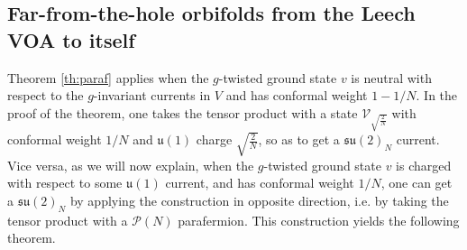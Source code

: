\documentclass[11pt,reqno]{article}
\newcommand{\CV}{\mathcal{V}}
\newcommand{\paraf}{\mathcal{P}}
\newcommand{\alg}[1]{\mathfrak{#1}}
\begin{document}
\subsection{Far-from-the-hole orbifolds from the Leech VOA to itself}

Theorem \ref{th:paraf} applies when the $g$-twisted ground state $v$ is neutral with respect to the $g$-invariant currents in $V$ and has conformal weight $1-1/N$. In the proof of the theorem, one takes the tensor product with a state $\CV_{\sqrt{\frac{2}{N}}}$ with conformal weight $1/N$ and $\alg{u}(1)$ charge $\sqrt{\frac{2}{N}}$, so as to get a $\alg{su}(2)_N$ current. Vice versa, as we will now explain, when  the $g$-twisted ground state $v$ is charged with respect to some $\alg{u}(1)$ current, and has conformal weight $1/N$, one can get a $\alg{su}(2)_N$ by applying the construction in opposite direction, i.e. by taking the tensor product with a $\paraf(N)$ parafermion. This construction yields the following theorem.
\end{document}
